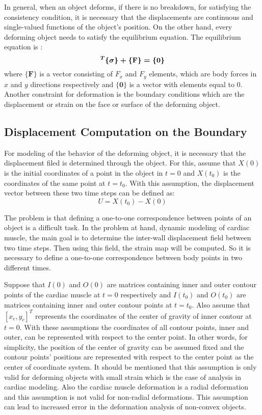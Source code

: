 \documentclass{jicspack}
\begin{document}
In general, when an object deforms, if there is no breakdown, for satisfying the consistency
condition, it is necessary that the displacements are continuous and single-valued functions
of the object's position. On the other hand, every deforming object needs to satisfy the
equilibrium equation. The equilibrium equation is \cite{22}: 
\begin{equation}
[\boldmath{\partial}]^T \{\boldmath{\sigma}\}+\{\textbf{F}\}=\{\textbf{0}\}
\end{equation}
where $\{\textbf{F}\}$ is a vector consisting of $F_x$ and $F_y$ elements, which are body forces in $x$ and $y$
directions respectively and $\{\textbf{0}\}$ is a vector with elements equal to 0. Another constraint for deformation is the boundary conditions which are the displacement or strain on the face or surface of the deforming object.



\subsection{Displacement Computation on the Boundary}
For modeling of the behavior of the deforming object, it is necessary that the displacement
filed is determined through the object. For this, assume that $X(0)$ is the initial coordinates of a point in the object in $t=0$ and $X(t_0)$ is the coordinates of the same point at $t=t_0$. With this assumption, the displacement vector between these two time steps can be defined as: 
\begin{equation}
U=X(t_0)-X(0)
\end{equation}

The problem is that defining a one-to-one correspondence between points of an object is a
difficult task. In the problem at hand, dynamic modeling of cardiac muscle, the main goal is to determine the
inter-wall displacement field between two time steps. Then using this field, the strain map
will be computed. So it is necessary to define a one-to-one correspondence between body
points in two different times. 

Suppose that $I(0)$ and $O(0)$ are matrices containing inner and outer contour points of the
cardiac muscle at $t=0$ respectively and $I(t_0)$ and $O(t_0)$ are matrices containing inner
and outer contour points at $t=t_0$. Also assume that $[x_c, y_c]^T$ represents the coordinates
of the center of gravity of inner contour at $t=0$. With these assumptions the coordinates
of all contour points, inner and outer, can be represented with respect to the center point. In
other words, for simplicity, the position of the center of gravity can be assumed fixed and the
contour points' positions are represented with respect to the center point as the center of
coordinate system. It should be mentioned that this assumption is only valid for deforming
objects with small strain which is the case of analysis in cardiac modeling. Also the cardiac
muscle deformation is a radial deformation and this assumption is not valid for non-radial
deformations. This assumption can lead to increased error in the deformation analysis of non-convex objects. 
\end{document}
